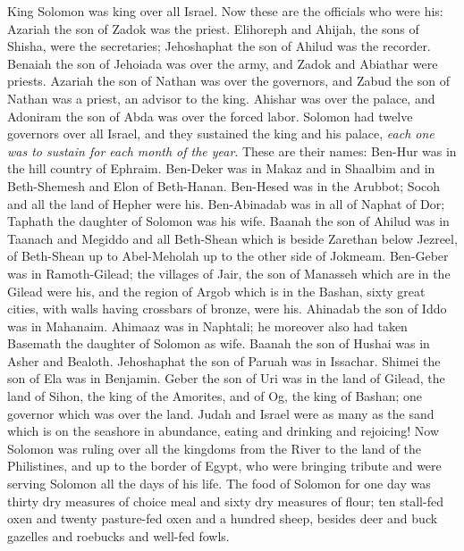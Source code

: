 \begin{biblechapter} %
 King Solomon was king over all Israel.
\verse Now these are the officials who were his: Azariah the son of Zadok was the priest.
\verse Elihoreph and Ahijah, the sons of Shisha, were the secretaries; Jehoshaphat the son of Ahilud was the recorder.
\verse Benaiah the son of Jehoiada was over the army, and Zadok and Abiathar were priests.
\verse Azariah the son of Nathan was over the governors, and Zabud the son of Nathan was a priest, an advisor to the king.
\verse Ahishar was over the palace, and Adoniram the son of Abda was over the forced labor.
\verse Solomon had twelve governors over all Israel, and they sustained the king and his palace, \textit{each one was to sustain for each month of the year}.
\verse These are their names: Ben-Hur was in the hill country of Ephraim.
\verse Ben-Deker was in Makaz and in Shaalbim and in Beth-Shemesh and Elon of Beth-Hanan.
\verse Ben-Hesed was in the Arubbot; Socoh and all the land of Hepher were his.
\verse Ben-Abinadab was in all of Naphat of Dor; Taphath the daughter of Solomon was his wife.
\verse Baanah the son of Ahilud was in Taanach and Megiddo and all Beth-Shean which is beside Zarethan below Jezreel, of Beth-Shean up to Abel-Meholah up to the other side of Jokmeam.
\verse Ben-Geber was in Ramoth-Gilead; the villages of Jair, the son of Manasseh which are in the Gilead were his, and the region of Argob which is in the Bashan, sixty great cities, with walls having crossbars of bronze, were his.
\verse Ahinadab the son of Iddo was in Mahanaim.
\verse Ahimaaz was in Naphtali; he moreover also had taken Basemath the daughter of Solomon as wife.
\verse Baanah the son of Hushai was in Asher and Bealoth.
\verse Jehoshaphat the son of Paruah was in Issachar.
\verse Shimei the son of Ela was in Benjamin.
\verse Geber the son of Uri was in the land of Gilead, the land of Sihon, the king of the Amorites, and of Og, the king of Bashan; one governor which was over the land.
\verse Judah and Israel were as many as the sand which is on the seashore in abundance, eating and drinking and rejoicing!
  Now Solomon was ruling over all the kingdoms from the River to the land of the Philistines, and up to the border of Egypt, who were bringing tribute and were serving Solomon all the days of his life.
\verse The food of Solomon for one day was thirty dry measures of choice meal and sixty dry measures of flour;
\verse ten stall-fed oxen and twenty pasture-fed oxen and a hundred sheep, besides deer and buck gazelles and roebucks and well-fed fowls.

\end{biblechapter}
